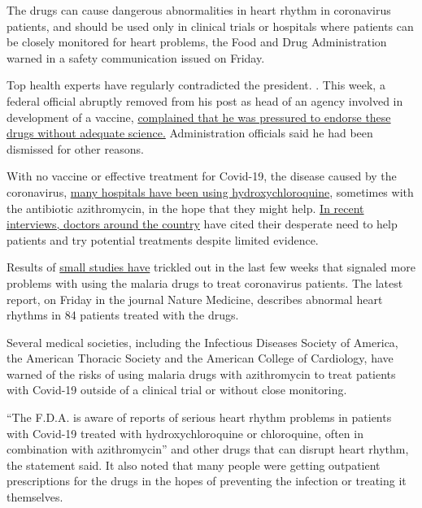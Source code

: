 The drugs can cause dangerous abnormalities in heart rhythm in
coronavirus patients, and should be used only in clinical trials or
hospitals where patients can be closely monitored for heart problems,
the Food and Drug Administration warned in a safety communication issued
on Friday.

Top health experts have regularly contradicted the president. . This
week, a federal official abruptly removed from his post as head of an
agency involved in development of a vaccine,
\href{https://www.nytimes.com/2020/04/23/us/politics/rick-bright-trump-hydroxychloroquine.html}{complained
that he was pressured to endorse these drugs without adequate science.}
Administration officials said he had been dismissed for other reasons.

With no vaccine or effective treatment for Covid-19, the disease caused
by the coronavirus,
\href{https://www.nytimes.com/2020/04/17/health/trump-hydroxychloroquine-coronavirus.html?searchResultPosition=2}{many
hospitals have been using hydroxychloroquine}, sometimes with the
antibiotic azithromycin, in the hope that they might help.
\href{https://www.nytimes.com/2020/04/17/health/trump-hydroxychloroquine-coronavirus.html}{In
recent interviews, doctors around the country} have cited their
desperate need to help patients and try potential treatments despite
limited evidence.

Results of
\href{https://www.nytimes.com/2020/04/12/health/chloroquine-coronavirus-trump.html?searchResultPosition=3}{small
studies have} trickled out in the last few weeks that signaled more
problems with using the malaria drugs to treat coronavirus patients. The
latest report, on Friday in the journal Nature Medicine, describes
abnormal heart rhythms in 84 patients treated with the drugs.

Several medical societies, including the Infectious Diseases Society of
America, the American Thoracic Society and the American College of
Cardiology, have warned of the risks of using malaria drugs with
azithromycin to treat patients with Covid-19 outside of a clinical trial
or without close monitoring.

``The F.D.A. is aware of reports of serious heart rhythm problems in
patients with Covid-19 treated with hydroxychloroquine or chloroquine,
often in combination with azithromycin'' and other drugs that can
disrupt heart rhythm, the statement said. It also noted that many people
were getting outpatient prescriptions for the drugs in the hopes of
preventing the infection or treating it themselves.

